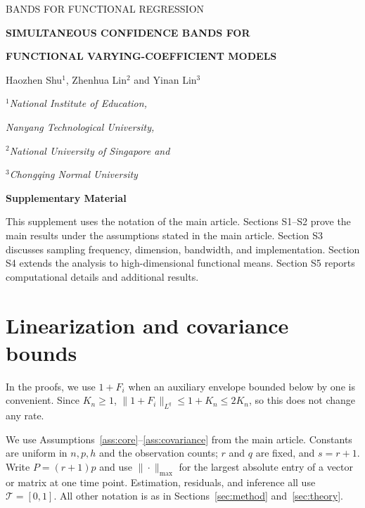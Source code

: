 \documentclass[10pt]{book}
\numberwithin{equation}{section}
\newcommand{\bodyfont}{\fontsize{12}{14pt plus.8pt minus .6pt}\selectfont}
\begin{document}
\renewcommand{\baselinestretch}{2}
\bodyfont
{}
{\hfill{\footnotesize\rm BANDS FOR FUNCTIONAL REGRESSION}\hfill}
\thispagestyle{firstpage}
$\ $\par\vspace{0.8pc}
\centerline{\large\bf SIMULTANEOUS CONFIDENCE BANDS FOR}
\vspace{2pt}
\centerline{\large\bf FUNCTIONAL VARYING-COEFFICIENT MODELS}
\vspace{.4cm}
\centerline{Haozhen Shu$^1$, Zhenhua Lin$^2$ and Yinan Lin$^3$}
\vspace{.4cm}
\centerline{\it $^1$National Institute of Education,}
\centerline{\it Nanyang Technological University,}
\centerline{\it $^2$National University of Singapore and}
\centerline{\it $^3$Chongqing Normal University}
\vspace{.55cm}

\raggedbottom
\centerline{\bf Supplementary Material}
\vspace{.55cm}
\fontsize{9}{11.5pt plus.8pt minus.6pt}\selectfont
This supplement uses the notation of the main article. Sections S1--S2 prove the main results under the assumptions stated in the main article. Section S3 discusses sampling frequency, dimension, bandwidth, and implementation. Section S4 extends the analysis to high-dimensional functional means. Section S5 reports computational details and additional results.
\par\bodyfont
\setcounter{section}{0}
\def\thesection{S\arabic{section}}
\renewcommand{\thetable}{S\arabic{table}}
\renewcommand{\thefigure}{S\arabic{figure}}
\section{Linearization and covariance bounds}
\label{app:hd-linear-covariance}

In the proofs, we use $1+F_i$ when an auxiliary envelope bounded below
by one is convenient. Since $K_n\ge1$,
$\|1+F_i\|_{L^q}\le1+K_n\le2K_n$, so this does not change any rate.

We use Assumptions~\ref{ass:core}--\ref{ass:covariance} from the main
article. Constants are uniform in $n,p,h$ and the observation counts;
$r$ and $q$ are fixed, and $s=r+1$.
Write $P=(r+1)p$ and use $\|\cdot\|_{\max}$ for the largest absolute
entry of a vector or matrix at one time point. Estimation, residuals,
and inference all use $\mathcal T=[0,1]$. All other notation is as in
Sections~\ref{sec:method} and~\ref{sec:theory}.
\end{document}
